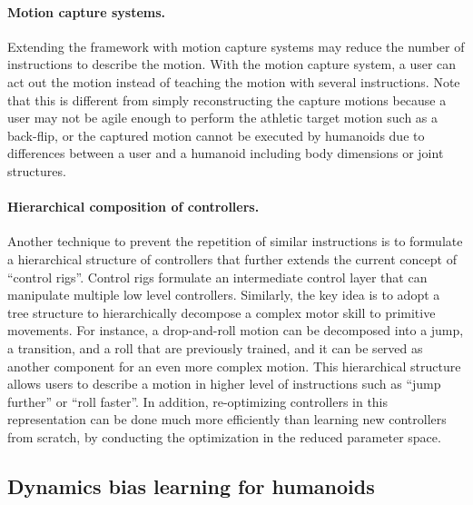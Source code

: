 \paragraph{Motion capture systems.}
Extending the framework with motion capture systems may reduce the number of
instructions to describe the motion.
With the motion capture system, a user can act out the motion instead of
teaching the motion with several instructions.
Note that this is different from simply reconstructing the capture motions
because a user may not be agile enough to perform the athletic target motion
such as a back-flip, 
or the captured motion cannot be executed by humanoids due to differences
between a user and a humanoid including body dimensions or joint structures.

\paragraph{Hierarchical composition of controllers.}
Another technique to prevent the repetition of similar instructions is to
formulate a hierarchical structure of controllers that further extends the
current concept of ``control rigs''.
Control rigs formulate an intermediate control layer that can manipulate
multiple low level controllers. 
Similarly, the key idea is to adopt a tree structure to hierarchically
decompose a complex motor skill to primitive movements. 
For instance, a drop-and-roll motion can be decomposed into a jump, a
transition, and a roll that are previously trained, and
it can be served as another component for an even more complex motion.
This hierarchical structure allows users to describe a motion in higher level
of instructions such as ``jump further'' or ``roll faster''.
In addition, re-optimizing controllers in this representation can be done much
more efficiently than learning new controllers from scratch, by conducting the
optimization in the reduced parameter space.

\subsection{Dynamics bias learning for humanoids} 

